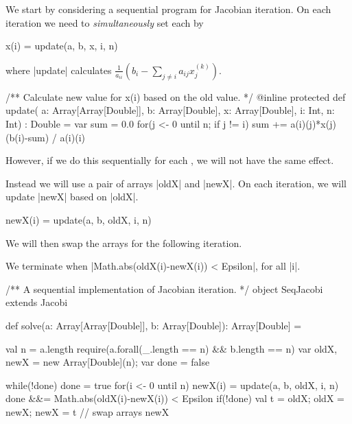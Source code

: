 
\begin{slide}

We start by considering a sequential program for Jacobian iteration. 
On each iteration we need to \emph{simultaneously} set each
 by
\begin{scala}
  x(i) = update(a, b, x, i, n)
\end{scala}
where |update| calculates 
\( \frac{1}{a_{ii}} \left(b_i -\sum_{j\ne i}a_{ij}x^{(k)}_j\right) \).
\begin{scala}
  /** Calculate new value for x(i) based on the old value. */ 
  @inline protected def update(
    a: Array[Array[Double]], b: Array[Double], x: Array[Double], i: Int, n: Int)
      : Double = {
    var sum = 0.0
    for(j <- 0 until n; if j != i) sum += a(i)(j)*x(j)
    (b(i)-sum) / a(i)(i)
  }
\end{scala}
%
However, if we do this sequentially for each , we will not have
the same effect.
\end{slide}


\begin{slide}

Instead we will use a pair of arrays |oldX| and |newX|.  On each iteration, we
will update |newX| based on |oldX|.  
\begin{scala}
  newX(i) = update(a, b, oldX, i, n)
\end{scala}
%
We will then swap the arrays for the following iteration.

We terminate when |Math.abs(oldX(i)-newX(i)) < Epsilon|, for all |i|.
\end{slide}


\begin{slide}

\begin{scala}
/** A sequential implementation of Jacobian iteration. */
object SeqJacobi extends Jacobi{
  def solve(a: Array[Array[Double]], b: Array[Double]): Array[Double] = {
    val n = a.length
    require(a.forall(_.length == n) && b.length == n)
    var oldX, newX = new Array[Double](n); var done = false

    while(!done){
      done = true
      for(i <- 0 until n){
        newX(i) = update(a, b, oldX, i, n)
	done &&= Math.abs(oldX(i)-newX(i)) < Epsilon
      }
      if(!done){ val t = oldX; oldX = newX; newX = t } // swap arrays
    }
    newX
} }
\end{scala}
\end{slide}


